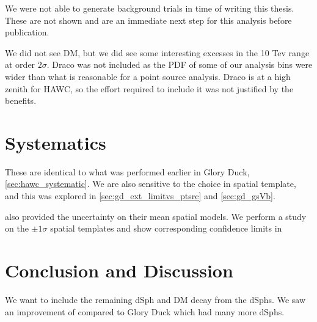 \begin{figure}[h]
{\begin{tabular}{cccc}
    \end{tabular}
    }
    \caption{}
\label{fig:mtd_compare2gd}
\end{figure}


We were not able to generate background trials in time of writing this thesis.
These are not shown and are an immediate next step for this analysis before publication.

We did not see DM, but we did see some interesting excesses in the 10 Tev range at order $2\sigma$.
Draco was not included as the PDF of some of our analysis bins were wider than what is reasonable for a point source analysis.
Draco is at a high zenith for HAWC, so the effort required to include it was not justified by the benefits.


\section{Systematics}\label{sec:mtd_systemaics}

These are identical to what was performed earlier in Glory Duck, \cref{sec:hawc_systematic}.
We are also sensitive to the choice in spatial template, and this was explored in \cref{sec:gd_ext_limitvs_ptsrc} and \cref{sec:gd_gsVb}.

\LS also provided the uncertainty on their mean spatial models.
We perform a study on the $\pm 1\sigma$ spatial templates and show corresponding confidence limits in 


\section{Conclusion and Discussion}\label{sec:mtd_conclusion}

We want to include the remaining dSph and DM decay from the dSphs.
We saw an improvement of  compared to Glory Duck which had many more dSphs.
